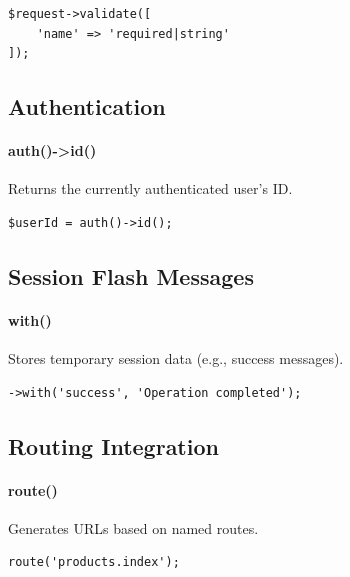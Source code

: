 \documentclass[12pt,a4paper]{article}
\begin{document}
\begin{verbatim}
$request->validate([
    'name' => 'required|string'
]);
\end{verbatim}

\subsection{Authentication}

\paragraph{auth()->id()}
Returns the currently authenticated user's ID.

\begin{verbatim}
$userId = auth()->id();
\end{verbatim}

\subsection{Session Flash Messages}

\paragraph{with()}
Stores temporary session data (e.g., success messages).

\begin{verbatim}
->with('success', 'Operation completed');
\end{verbatim}

\subsection{Routing Integration}

\paragraph{route()}
Generates URLs based on named routes.

\begin{verbatim}
route('products.index');
\end{verbatim}


\end{document}
